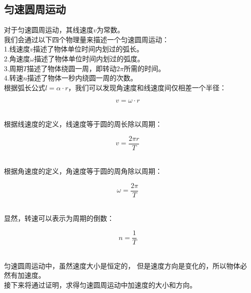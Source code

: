 \documentclass[UTF8]{ctexart}
\begin{document}
\subsection{匀速圆周运动}
    对于匀速圆周运动，其线速度$v$为常数。\\[4mm]
    我们会通过以下四个物理量来描述一个匀速圆周运动：\\[3mm]
    1.线速度$v$描述了物体单位时间内划过的弧长。\\[2mm]
    2.角速度$\omega$描述了物体单位时间内划过的弧度。\\[2mm]
    3.周期$T$描述了物体绕圆一周，即转动$2\pi$所需的时间。\\[2mm]
    4.转速$n$描述了物体一秒内绕圆一周的次数。\\[5mm]
    根据弧长公式$l=\alpha\cdot r$，我们可以发现角速度和线速度间仅相差一个半径：
    \begin{large}
        \begin{equation*}
            v=\omega\cdot r
        \end{equation*}
    \end{large}\\
    根据线速度的定义，线速度等于圆的周长除以周期：\\
    \begin{large}
        \begin{equation*}
            v=\frac{2\pi r}{T}
        \end{equation*}
    \end{large}\\
    根据角速度的定义，角速度等于圆的周角除以周期：\\
    \begin{large}
        \begin{equation*}
            \omega=\frac{2\pi}{T}
        \end{equation*}
    \end{large}\\
    显然，转速可以表示为周期的倒数：\\
    \begin{large}
        \begin{equation*}
            n=\frac{1}{T}
        \end{equation*}
    \end{large}\\[1mm]
    匀速圆周运动中，虽然速度大小是恒定的，
    但是速度方向是变化的，所以物体必然有加速度。\\[3mm]
    接下来将通过证明，求得匀速圆周运动中加速度的大小和方向。
\end{document}
